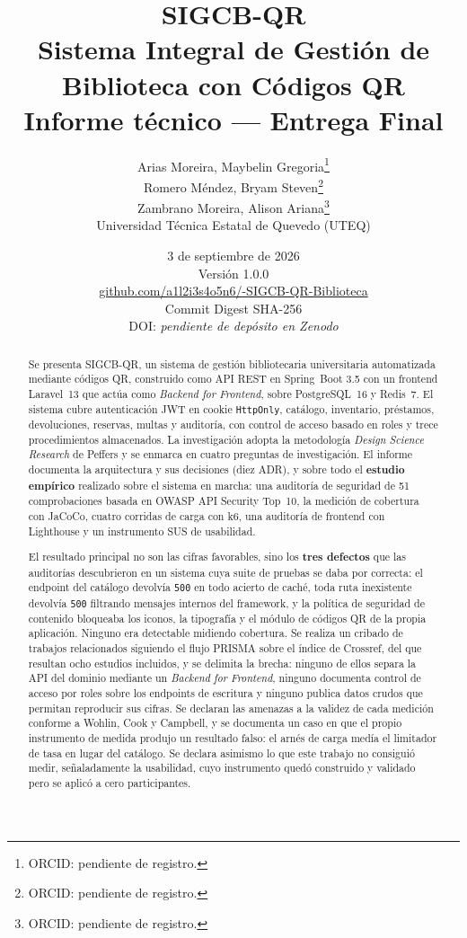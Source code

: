 \documentclass[11pt,a4paper]{article}
\title{\textbf{SIGCB-QR}\\[0.3em]
\large Sistema Integral de Gestión de Biblioteca con Códigos QR\\[0.8em]
\normalsize Informe técnico --- Entrega Final}
\author{Arias Moreira, Maybelin Gregoria\thanks{ORCID: pendiente de registro.}\\
Romero Méndez, Bryam Steven\thanks{ORCID: pendiente de registro.}\\
Zambrano Moreira, Alison Ariana\thanks{ORCID: pendiente de registro.}\\
\small Universidad Técnica Estatal de Quevedo (UTEQ)}
\date{3 de septiembre de 2026 \\ \small Versión 1.0.0\\
\href{https://github.com/a1l2i3s4o5n6/-SIGCB-QR-Biblioteca}{github.com/a1l2i3s4o5n6/-SIGCB-QR-Biblioteca}\\[0.3em]
\footnotesize Commit \texttt{\unskip} \quad
Digest SHA-256 \texttt{\unskip}\\
DOI: \emph{pendiente de depósito en Zenodo}}
\begin{document}
\maketitle
\thispagestyle{empty}
\newpage
{}

\begin{abstract}
\noindent
Se presenta SIGCB-QR, un sistema de gestión bibliotecaria universitaria
automatizada mediante códigos QR, construido como API REST en Spring~Boot 3.5
con un frontend Laravel~13 que actúa como \emph{Backend for Frontend}, sobre
PostgreSQL~16 y Redis~7. El sistema cubre autenticación JWT en cookie
\texttt{HttpOnly}, catálogo, inventario, préstamos, devoluciones, reservas,
multas y auditoría, con control de acceso basado en roles y trece procedimientos
almacenados. La investigación adopta la metodología \emph{Design Science
Research} de Peffers y se enmarca en cuatro preguntas de investigación. El
informe documenta la arquitectura y sus decisiones (diez ADR), y sobre todo el
\textbf{estudio empírico} realizado sobre el sistema en marcha: una auditoría de
seguridad de 51 comprobaciones basada en OWASP API Security Top~10, la medición
de cobertura con JaCoCo, cuatro corridas de carga con k6, una auditoría de
frontend con Lighthouse y un instrumento SUS de usabilidad.

El resultado principal no son las cifras favorables, sino los \textbf{tres
defectos} que las auditorías descubrieron en un sistema cuya suite de pruebas se
daba por correcta: el endpoint del catálogo devolvía \texttt{500} en todo acierto
de caché, toda ruta inexistente devolvía \texttt{500} filtrando mensajes internos
del framework, y la política de seguridad de contenido bloqueaba los iconos, la
tipografía y el módulo de códigos QR de la propia aplicación. Ninguno era
detectable midiendo cobertura. Se realiza un cribado de trabajos relacionados
siguiendo el flujo PRISMA sobre el índice de Crossref, del que resultan ocho
estudios incluidos, y se delimita la brecha: ninguno de ellos separa la API del
dominio mediante un \emph{Backend for Frontend}, ninguno documenta control de
acceso por roles sobre los endpoints de escritura y ninguno publica datos crudos
que permitan reproducir sus cifras. Se declaran las amenazas a la validez de cada
medición conforme a Wohlin, Cook y Campbell, y se documenta un caso en que el
propio instrumento de medida produjo un resultado falso: el arnés de carga medía
el limitador de tasa en lugar del catálogo. Se declara asimismo lo que este
trabajo no consiguió medir, señaladamente la usabilidad, cuyo instrumento quedó
construido y validado pero se aplicó a cero participantes.


\end{abstract}
\end{document}
